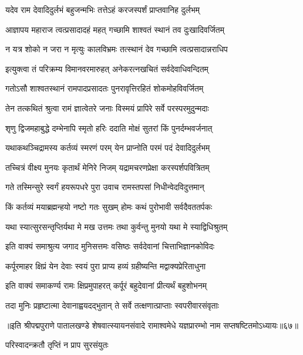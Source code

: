 \twolineshloka
{यदेव राम देवादिदुर्लभं बहुजन्मभिः}
{तत्तेऽहं करजस्पर्शं प्राप्तवानिह दुर्लभम्}%

\twolineshloka
{आज्ञापय महाराज त्वत्प्रसादादहं महत्}
{गच्छामि शाश्वतं स्थानं तव दुःखादिवर्जितम्}%

\twolineshloka
{न यत्र शोको न जरा न मृत्युः कालविभ्रमः}
{तत्स्थानं देव गच्छामि त्वत्प्रसादान्नराधिप}%

\twolineshloka
{इत्युक्त्वा तं परिक्रम्य विमानवरमारुहत्}
{अनेकरत्नखचितं सर्वदेवाधिवन्दितम्}%

\twolineshloka
{गतोऽसौ शाश्वतस्थानं रामपादप्रसादतः}
{पुनरावृत्तिरहितं शोकमोहविवर्जितम्}%

\twolineshloka
{तेन तत्कथितं श्रुत्वा रामं ज्ञात्वेतरे जनाः}
{विस्मयं प्रापिरे सर्वे परस्परमुदुन्मदाः}%

\twolineshloka
{शृणु द्विजमहाबुद्धे दम्भेनापि स्मृतो हरिः}
{ददाति मोक्षं सुतरां किं पुनर्दम्भवर्जनात्}%

\twolineshloka
{यथाकथञ्चिद्रामस्य कर्तव्यं स्मरणं परम्}
{येन प्राप्नोति परमं पदं देवादिदुर्लभम्}%

\twolineshloka
{तच्चित्रं वीक्ष्य मुनयः कृतार्थं मेनिरे निजम्}
{यद्रामचरणप्रेक्षा करस्पर्शपवित्रितम्}%

\twolineshloka
{गते तस्मिन्सुरे स्वर्गं हयरूपधरे पुरा}
{उवाच रामस्तपसां निधीन्वेदविदुत्तमान्}%

\twolineshloka
{किं कर्तव्यं मयाब्रह्मन्हयो नष्टो गतः सुखम्}
{होमः कथं पुरोभावी सर्वदैवततर्पकः}%

\twolineshloka
{यथा स्यात्सुरसन्तृप्तिर्यथा मे मख उत्तमः}
{तथा कुर्वन्तु मुनयो यथा मे स्याद्विधिश्रुतम्}%

\twolineshloka
{इति वाक्यं समाश्रुत्य जगाद मुनिसत्तमः}
{वसिष्ठः सर्वदेवानां चित्ताभिज्ञानकोविदः}%

\twolineshloka
{कर्पूरमाहर क्षिप्रं येन देवाः स्वयं पुरा}
{प्राप्य हव्यं ग्रहीष्यन्ति मद्वाक्यप्रेरिताधुना}%

\twolineshloka
{इति वाक्यं समाकर्ण्य रामः क्षिप्रमुपाहरत्}
{कर्पूरं बहुदेवानां प्रीत्यर्थं बहुशोभनम्}%

\twolineshloka
{तदा मुनिः प्रहृष्टात्मा देवानाह्वयदद्भुतान्}
{ते सर्वे तत्क्षणात्प्राप्ताः स्वपरीवारसंवृताः}%

{॥इति श्रीपद्मपुराणे पातालखण्डे शेषवात्स्यायनसंवादे रामाश्वमेधे यज्ञप्रारम्भो नाम सप्तषष्टितमोऽध्यायः॥६७॥}

\resetShloka


\onelineshloka
{परिस्वादन्क्रतौ तृप्तिं न प्राप सुरसंयुतः}%

